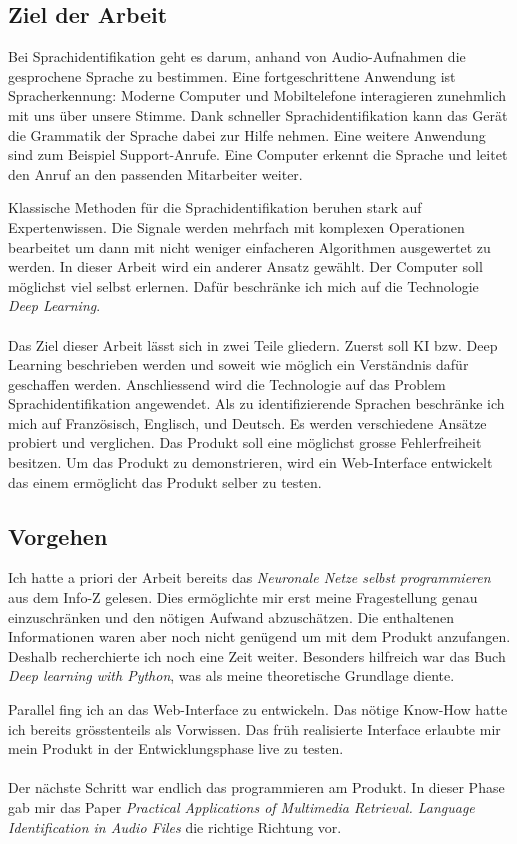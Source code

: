 \subsection{Ziel der Arbeit}
Bei Sprachidentifikation geht es darum, anhand von Audio-Aufnahmen die gesprochene Sprache zu bestimmen. Eine fortgeschrittene Anwendung ist Spracherkennung: Moderne
Computer und Mobiltelefone interagieren zunehmlich mit uns über unsere Stimme. Dank schneller Sprachidentifikation kann das Gerät die Grammatik der Sprache dabei zur Hilfe
nehmen.
Eine weitere Anwendung sind zum Beispiel Support-Anrufe. Eine Computer erkennt die Sprache und leitet den Anruf an den passenden Mitarbeiter weiter.

Klassische Methoden für die Sprachidentifikation beruhen stark auf Expertenwissen. Die Signale werden mehrfach mit komplexen Operationen bearbeitet um dann mit nicht weniger
einfacheren Algorithmen ausgewertet zu werden.
In dieser Arbeit wird ein anderer Ansatz gewählt. Der Computer soll möglichst viel selbst erlernen. Dafür beschränke ich mich auf die Technologie \textit{Deep Learning}.
\\ \\ 
Das Ziel dieser Arbeit lässt sich in zwei Teile gliedern. Zuerst soll KI bzw. Deep Learning beschrieben werden und soweit wie möglich ein Verständnis dafür geschaffen werden.
Anschliessend wird die Technologie auf das Problem Sprachidentifikation angewendet. Als zu identifizierende Sprachen beschränke ich mich auf Französisch, Englisch, und Deutsch. Es
werden verschiedene Ansätze probiert und verglichen. Das Produkt soll eine möglichst grosse Fehlerfreiheit besitzen. Um das Produkt zu demonstrieren, wird ein Web-Interface
entwickelt das einem ermöglicht das Produkt selber zu testen.

\subsection{Vorgehen}
Ich hatte a priori der Arbeit bereits das \textit{Neuronale Netze selbst programmieren}\parencite{neuronale_netze} aus dem Info-Z gelesen. Dies ermöglichte mir erst meine
Fragestellung genau einzuschränken und den nötigen Aufwand abzuschätzen.
Die enthaltenen Informationen waren aber noch nicht genügend um mit dem Produkt anzufangen. Deshalb recherchierte ich noch eine Zeit weiter. Besonders hilfreich war das Buch
\textit{Deep learning with Python}\parencite{chollet}, was als meine theoretische Grundlage diente.

Parallel fing ich an das Web-Interface zu entwickeln. Das nötige Know-How hatte ich bereits grösstenteils als Vorwissen. Das früh realisierte Interface erlaubte mir mein Produkt in der
Entwicklungsphase live zu testen.
\\ \\ 
Der nächste Schritt war endlich das programmieren am Produkt. In dieser Phase gab mir das Paper \textit{Practical Applications of Multimedia Retrieval. Language Identification in Audio
Files}\parencite{iLID} die richtige Richtung vor. 

